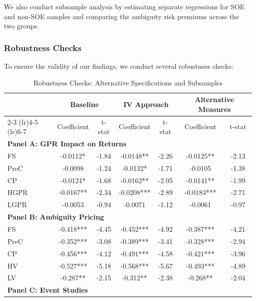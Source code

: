 \documentclass[preprint,12pt,authoryear]{elsarticle}
\begin{document}
We also conduct subsample analysis by estimating separate regressions for SOE and non-SOE samples and comparing the ambiguity risk premiums across the two groups.

\subsubsection{Robustness Checks}
\label{sec:robustness}

To ensure the validity of our findings, we conduct several robustness checks:

\begin{table}[htbp]
\centering
\caption{Robustness Checks: Alternative Specifications and Subsamples}
\label{tab:robustness}
\begin{threeparttable}
\begin{tabular*}{\textwidth}{@{\extracolsep{\fill}} lcccccc @{\extracolsep{\fill}}}
\toprule
& \multicolumn{2}{c}{Baseline} & \multicolumn{2}{c}{IV Approach} & \multicolumn{2}{c}{Alternative Measures} \\
\cmidrule(lr){2-3} \cmidrule(lr){4-5} \cmidrule(lr){6-7}
& Coefficient & t-stat & Coefficient & t-stat & Coefficient & t-stat \\
\midrule
\midrule
\multicolumn{7}{l}{\textbf{Panel A: GPR Impact on Returns}} \\
FS & -0.0112* & -1.84 & -0.0148** & -2.26 & -0.0125** & -2.13 \\
PreC & -0.0098 & -1.24 & -0.0132* & -1.71 & -0.0105 & -1.38 \\
CP & -0.0124* & -1.68 & -0.0162** & -2.05 & -0.0141** & -1.99 \\
HGPR & -0.0167** & -2.34 & -0.0208*** & -2.89 & -0.0183*** & -2.71 \\
LGPR & -0.0053 & -0.94 & -0.0071 & -1.12 & -0.0061 & -0.97 \\
\midrule
\multicolumn{7}{l}{\textbf{Panel B: Ambiguity Pricing}} \\
FS & -0.418*** & -4.45 & -0.452*** & -4.92 & -0.387*** & -4.21 \\
PreC & -0.352*** & -3.08 & -0.389*** & -3.41 & -0.328*** & -2.94 \\
CP & -0.456*** & -4.12 & -0.491*** & -4.58 & -0.421*** & -3.96 \\
HV & -0.527*** & -5.18 & -0.568*** & -5.67 & -0.493*** & -4.89 \\
LV & -0.287** & -2.15 & -0.312** & -2.38 & -0.268** & -2.04 \\
\midrule
\multicolumn{7}{l}{\textbf{Panel C: Event Studies}} \\

\end{tabular*}
\end{threeparttable}
\end{table}
\end{document}
